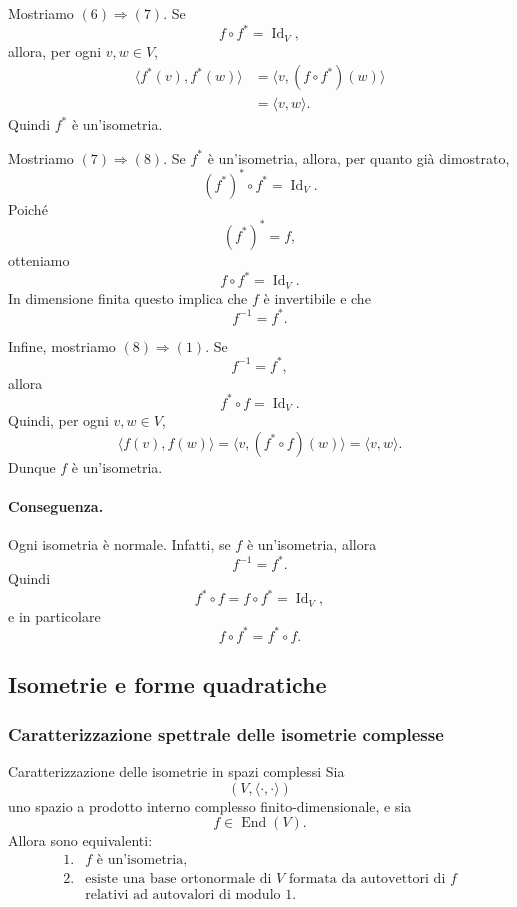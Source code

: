 \documentclass[a4paper]{article}
\begin{document}
\begin{snippetproof}{}
    Mostriamo \((6)\Rightarrow(7)\). Se
    \[
        f\circ f^*=\operatorname{Id}_V,
    \]
    allora, per ogni \(v,w\in V\),
    \begin{align*}
        \langle f^*(v),f^*(w)\rangle
        &=
        \langle v,(f\circ f^*)(w)\rangle\\
        &=
        \langle v,w\rangle.
    \end{align*}
    Quindi \(f^*\) è un'isometria.

    Mostriamo \((7)\Rightarrow(8)\). Se \(f^*\) è un'isometria, allora, per quanto già dimostrato,
    \[
        (f^*)^*\circ f^*=\operatorname{Id}_V.
    \]
    Poiché
    \[
        (f^*)^*=f,
    \]
    otteniamo
    \[
        f\circ f^*=\operatorname{Id}_V.
    \]
    In dimensione finita questo implica che \(f\) è invertibile e che
    \[
        f^{-1}=f^*.
    \]

    Infine, mostriamo \((8)\Rightarrow(1)\). Se
    \[
        f^{-1}=f^*,
    \]
    allora
    \[
        f^*\circ f=\operatorname{Id}_V.
    \]
    Quindi, per ogni \(v,w\in V\),
    \[
        \langle f(v),f(w)\rangle
        =
        \langle v,(f^*\circ f)(w)\rangle
        =
        \langle v,w\rangle.
    \]
    Dunque \(f\) è un'isometria.
\end{snippetproof}

\paragraph{Conseguenza.}
Ogni isometria è normale. Infatti, se \(f\) è un'isometria, allora
\[
    f^{-1}=f^*.
\]
Quindi
\[
    f^*\circ f=f\circ f^*=\operatorname{Id}_V,
\]
e in particolare
\[
    f\circ f^*=f^*\circ f.
\]

\subsection{Isometrie e forme quadratiche}

\subsubsection{Caratterizzazione spettrale delle isometrie complesse}

\begin{snippettheorem}{Caratterizzazione delle isometrie in spazi complessi}
    Sia
    \[
        (V,\langle\cdot,\cdot\rangle)
    \]
    uno spazio a prodotto interno complesso finito-dimensionale, e sia
    \[
        f\in\operatorname{End}(V).
    \]
    Allora sono equivalenti:
    \[
        \begin{array}{ll}
            \text{1.} & f \text{ è un'isometria},\\[1mm]
            \text{2.} & \text{esiste una base ortonormale di } V
            \text{ formata da autovettori di } f\\
            & \text{relativi ad autovalori di modulo }1.
        \end{array}
    \]
\end{snippettheorem}
\end{document}
